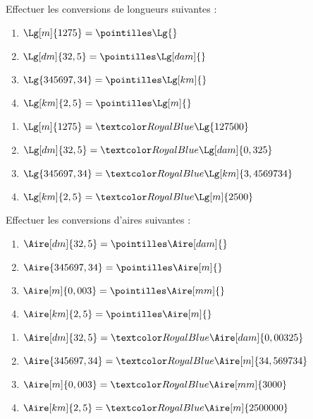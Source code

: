 \begin{Maquette}[Fiche,CorrigeFin,Colonnes=2]{}
   
   \begin{multicols}{2}

         \begin{exercice}[SLF] %
            Effectuer les conversions de longueurs suivantes :
            \begin{enumerate}
               \item $\Lg[m]{1275} =\pointilles \Lg{}$
               \item $\Lg[dm]{32,5} =\pointilles \Lg[dam]{}$
               \item $\Lg{345697,34} =\pointilles \Lg[km]{}$
               \item $\Lg[km]{2,5} =\pointilles \Lg[m]{}$
            \end{enumerate}
         \end{exercice}
         
         \begin{Solution}
            \begin{enumerate}
               \item $\Lg[m]{1275} =\cor{\Lg{127500}}$
               \item $\Lg[dm]{32,5} =\cor{\Lg[dam]{0,325}}$
               \item $\Lg{345697,34} =\cor{\Lg[km]{3,4569734}}$
               \item $\Lg[km]{2,5} =\cor{\Lg[m]{2500}}$
            \end{enumerate}
         \end{Solution}
         
         
         \begin{exercice}[SLF] %
            Effectuer les conversions d'aires suivantes :
            \begin{enumerate}
               \item $\Aire[dm]{32,5} =\pointilles\Aire[dam]{}$
               \item $\Aire{345697,34} =\pointilles\Aire[m]{}$
               \item $\Aire[m]{0,003} =\pointilles\Aire[mm]{}$
               \item $\Aire[km]{2,5} =\pointilles \Aire[m]{}$
            \end{enumerate}
         \end{exercice}
         
         \begin{Solution}
            \begin{enumerate}
               \item $\Aire[dm]{32,5} =\cor{\Aire[dam]{0,00325}}$
               \item $\Aire{345697,34} =\cor{\Aire[m]{34,569734}}$
               \item $\Aire[m]{0,003} =\cor{\Aire[mm]{3000}}$
               \item $\Aire[km]{2,5} =\cor{\Aire[m]{2500000}}$
            \end{enumerate}
         \end{Solution}
         

\end{multicols}
\end{Maquette}
